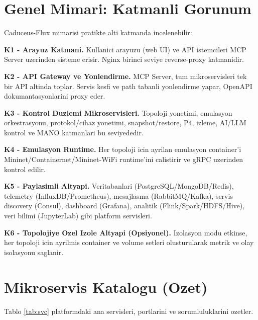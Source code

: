 \documentclass[conference]{IEEEtran}
\begin{document}
\section{Genel Mimari: Katmanli Gorunum}
Caduceus-Flux mimarisi pratikte alti katmanda incelenebilir:

\textbf{K1 - Arayuz Katmani.} Kullanici arayuzu (web UI) ve API istemcileri MCP Server uzerinden sisteme erisir. Nginx birinci seviye reverse-proxy katmanidir.

\textbf{K2 - API Gateway ve Yonlendirme.} MCP Server, tum mikroservisleri tek bir API altinda toplar. Servis kesfi ve path tabanli yonlendirme yapar, OpenAPI dokumantasyonlarini proxy eder.

\textbf{K3 - Kontrol Duzlemi Mikroservisleri.} Topoloji yonetimi, emulasyon orkestrasyonu, protokol/cihaz yonetimi, snapshot/restore, P4, izleme, AI/LLM kontrol ve MANO katmanlari bu seviyededir.

\textbf{K4 - Emulasyon Runtime.} Her topoloji icin ayrilan emulasyon container'i Mininet/Containernet/Mininet-WiFi runtime'ini calistirir ve gRPC uzerinden kontrol edilir.

\textbf{K5 - Paylasimli Altyapi.} Veritabanlari (PostgreSQL/MongoDB/Redis), telemetry (InfluxDB/Prometheus), mesajlasma (RabbitMQ/Kafka), servis discovery (Consul), dashboard (Grafana), analitik (Flink/Spark/HDFS/Hive), veri bilimi (JupyterLab) gibi platform servisleri.

\textbf{K6 - Topolojiye Ozel Izole Altyapi (Opsiyonel).} Izolasyon modu etkinse, her topoloji icin ayrilmis container ve volume setleri olusturularak metrik ve olay isolasyonu saglanir.

\section{Mikroservis Katalogu (Ozet)}
Tablo \ref{tab:svc} platformdaki ana servisleri, portlarini ve sorumluluklarini ozetler.
\end{document}
